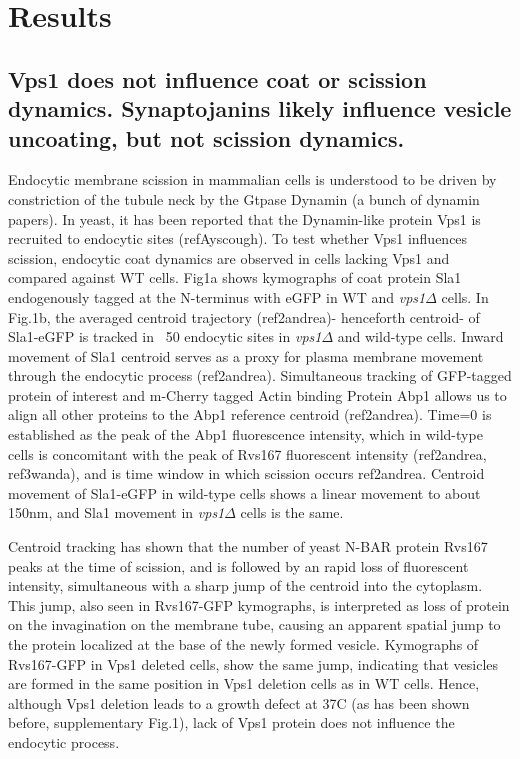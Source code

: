 \documentclass[9pt,lineno]{elife}
\begin{document}
\section{Results}
\subsection{Vps1 does not influence coat or scission dynamics. Synaptojanins likely influence vesicle uncoating, but not scission dynamics.}

Endocytic membrane scission in mammalian cells is understood to be driven by constriction of the tubule neck by the Gtpase Dynamin (a bunch of dynamin papers). In yeast, it has been reported that the Dynamin-like protein Vps1 is recruited to endocytic sites (refAyscough). To test whether Vps1 influences scission, endocytic coat dynamics are observed in cells lacking Vps1 and compared against WT cells. Fig1a shows kymographs of coat protein Sla1 endogenously tagged at the N-terminus with eGFP in WT and \textit{vps1$\Delta$} cells. In Fig.1b, the averaged centroid trajectory (ref2andrea)- henceforth centroid- of Sla1-eGFP is tracked in ~50 endocytic sites in \textit{vps1$\Delta$} and wild-type cells. Inward movement of Sla1 centroid serves as a proxy for plasma membrane movement through the endocytic process (ref2andrea). Simultaneous tracking of GFP-tagged protein of interest and m-Cherry tagged Actin binding Protein Abp1 allows us to align all other proteins to the Abp1 reference centroid (ref2andrea). Time=0 is established as the peak of the Abp1 fluorescence intensity, which in wild-type cells is concomitant with the peak of Rvs167 fluorescent intensity (ref2andrea, ref3wanda), and is time window in which scission occurs {ref2andrea}. Centroid movement of Sla1-eGFP in wild-type cells shows a linear movement to about 150nm, and Sla1 movement in \textit{vps1$\Delta$} cells is the same. 

Centroid tracking has shown that the number of yeast N-BAR protein Rvs167 peaks at the time of scission, and is followed by an rapid loss of fluorescent intensity, simultaneous with a sharp jump of the centroid into the cytoplasm. This jump, also seen in Rvs167-GFP kymographs, is interpreted as loss of protein on the invagination on the membrane tube, causing an apparent spatial jump to the protein localized at the base of the newly formed vesicle. Kymographs of Rvs167-GFP in Vps1 deleted cells, show the same jump, indicating that vesicles are formed in the same position in Vps1 deletion cells as in WT cells. Hence, although Vps1 deletion leads to a growth defect at 37C (as has been shown before, supplementary Fig.1), lack of Vps1 protein does not influence the endocytic process.
\end{document}
